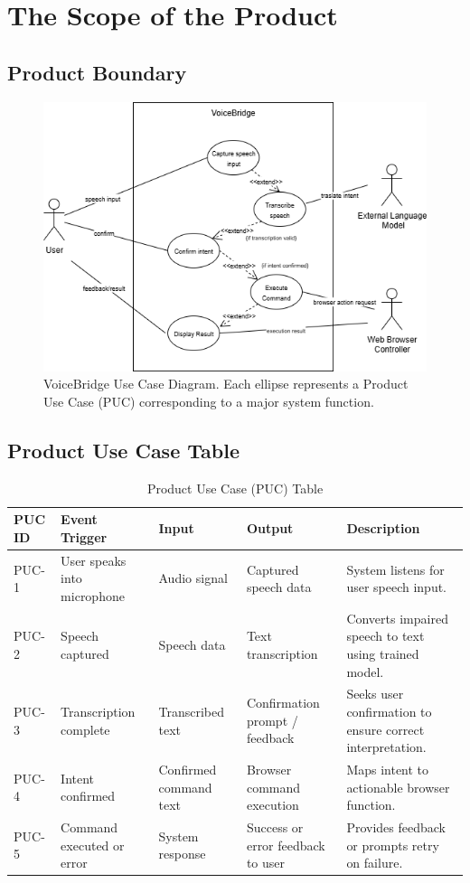 \documentclass[11pt]{article}
\begin{document}
\section{The Scope of the Product}
\subsection{Product Boundary}
\begin{figure}[H]
    \centering
    \includegraphics[width=1\textwidth]{..//imgs/VoiceBridge_use_case_diagram.png}
    \caption{VoiceBridge Use Case Diagram. Each ellipse represents a Product Use Case (PUC) corresponding to a major system function.}
    \label{fig:voicebridge-usecase}
\end{figure} 
\subsection{Product Use Case Table}
\begin{table}[H]
\centering
\caption{Product Use Case (PUC) Table}
\begin{tabularx}{\textwidth}{p{1.5cm}p{3cm}p{2.5cm}p{3cm}X}
\toprule
\textbf{PUC ID} & \textbf{Event Trigger} & \textbf{Input} & \textbf{Output} & \textbf{Description} \\
\midrule
PUC-1 & User speaks into microphone & Audio signal & Captured speech data & System listens for user speech input. \\
PUC-2 & Speech captured & Speech data & Text transcription & Converts impaired speech to text using trained model. \\
PUC-3 & Transcription complete & Transcribed text & Confirmation prompt / feedback & Seeks user confirmation to ensure correct interpretation. \\
PUC-4 & Intent confirmed & Confirmed command text & Browser command execution & Maps intent to actionable browser function. \\
PUC-5 & Command executed or error & System response & Success or error feedback to user & Provides feedback or prompts retry on failure. \\
\bottomrule
\end{tabularx}
\end{table}
\end{document}
